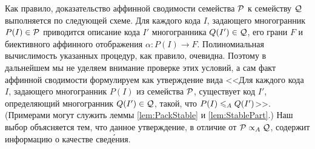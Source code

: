 
\begin{comment}
\begin{remark}
	В~определении \ref{def:Aff} важным условием является полиномиальная зависимость относительно размера многогранника, а~не~его размерности. 
	Дело в том, что система ограничений, определяющих многогранник, может оказаться далеко не самым экономным способом его описания. Тем не менее, нашей целью является именно сравнение входных данных задач, ассоциированных с многогранниками.
	
	В~качестве примера многогранника с неэкономным описанием можно рассмотреть $\Part(A)$, задаваемый уравнениями
	\[
	x_1 + x_i + x_j = 1, \quad 2 \le i < j \le n.
	\]
	Очевидно, он состоит из одной единственной точки $(1,0,\dots,0)$.
	Вместе с тем, согласно соотношению \eqref{eq:PartPack}, он является гранью многогранника $\Pack(A)$, определяемого неравенствами
	\[
	x_1 + x_i + x_j \le 1, \quad 2 \le i < j \le n,
	\]
	и имеющего размерность $n$.
	Такой <<неэкономный>> способ сравнения многогранников вполне допускается определением~\ref{def:Aff}.
\end{remark}
\end{comment}


\begin{remark}
Как правило, доказательство аффинной сводимости семейства ${\mathcal P}$ к семейству ${\mathcal Q}$ выполняется по следующей схеме.
Для каждого кода $I$, задающего многогранник $P(I)\in {\mathcal P}$ приводится описание кода $I'$ многогранника $Q(I')\in {\mathcal Q}$, его грани $F$ и биективного аффинного отображения $\alpha\colon P(I) \to F$.
Полиномиальная вычислимость указанных процедур, как правило, очевидна.
Поэтому в дальнейшем мы не уделяем внимание проверке этих условий, а сам факт аффинной сводимости формулируем как утверждение вида
<<Для каждого кода $I$, задающего многогранник $P(I)$ из семейства ${\mathcal P}$, существует код $I'$, определяющий многогранник $Q(I')\in {\mathcal Q}$, такой, что $P(I) \leqslant_A Q(I')$>>.
(Примерами %
могут служить леммы \ref{lem:PackStable} и \ref{lem:StablePart}.)
Наш выбор объясняется тем, что данное утверждение, в отличие от ${\mathcal P} \propto_A {\mathcal Q}$, содержит информацию о качестве свед\'{е}ния. 
\end{remark}

